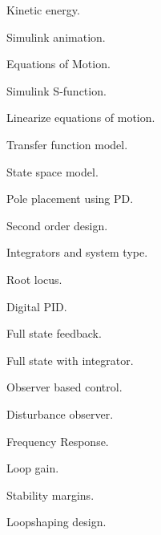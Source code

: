 
	

\par{}
\begin{multicols}{2}
\begin{description}
\setlength{\itemsep}{0pt}
\setlength{\parskip}{0pt}
	\item {\bf{}} Kinetic energy.
	\item {\bf{}} Simulink animation.	
	\item {\bf{}} Equations of Motion.
	\item {\bf{}} Simulink S-function.
	\item {\bf{}} Linearize equations of motion.
	\item {\bf{}} Transfer function model.
	\item {\bf{}} State space model.
	\item {\bf{}} Pole placement using PD.
	\item {\bf{}} Second order design.
	\item {\bf{}} Integrators and system type.
	\item {\bf{}} Root locus.
	\item {\bf{}} Digital PID.
	\item {\bf{}} Full state feedback.
	\item {\bf{}} Full state with integrator.
	\item {\bf{}} Observer based control.
	\item {\bf{}} Disturbance observer.
	\item {\bf{}} Frequency Response.
	\item {\bf{}} Loop gain.
	\item {\bf{}} Stability margins.
	\item {\bf{}} Loopshaping design.
\end{description}
\end{multicols}

